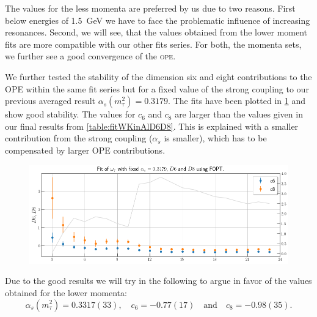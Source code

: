 \documentclass[../../index.tex]{subfiles}
\begin{document}
The values for the less momenta are preferred by us due to two reasons. First
below energies of \SI{1.5}{\giga\eV} we have to face the problematic influence
of increasing resonances. Second, we will see, that the values obtained from the
lower moment fits are more compatible with our other fits series. For both, the
momenta sets, we further see a good convergence of the \textsc{ope}.

We further tested the stability of the dimension six and eight contributions to
the OPE within the same fit series but for a fixed value of the strong coupling 
to our previous averaged result $\alpha_s(m_\tau^2)=0.3179$. The fits have been
plotted in \cref{fig:fitWKinD6D8} and show good stability. The values for $c_6$
and $c_8$ are larger than the values given in our final results from
\cref{table:fitWKinAlD6D8}. This is explained with a smaller contribution from
the strong coupling ($\alpha_s$ is smaller), which has to be compensated by
larger OPE contributions. 
\begin{figure}
  \centering
  \includegraphics[width=\textwidth]{./images/fitWKinD6D8.png}
  \label{fig:fitWKinD6D8}
\end{figure}

Due to the good results we will try in the following to argue in favor of the
values obtained for the lower momenta:
\begin{equation}
  \label{eq:wKinResult}
  \alpha_s(m_\tau^2) = 0.3317(33), \quad c_6 = -0.77(17) \quad \text{and} \quad
  c_8 = -0.98(35).
\end{equation}
\end{document}
